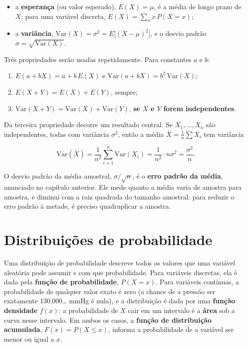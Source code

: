 \documentclass[
]{book}
\providecommand{\tightlist}{%
  \setlength{\itemsep}{0pt}\setlength{\parskip}{0pt}}
\begin{document}
\begin{itemize}
\tightlist
\item
  a \textbf{esperança} (ou valor esperado), \(E(X) = \mu\), é a média de longo prazo de \(X\); para uma variável discreta, \(E(X) = \sum_x x\,P(X = x)\);
\item
  a \textbf{variância}, \(\text{Var}(X) = \sigma^2 = E\big[(X - \mu)^2\big]\), e o desvio padrão \(\sigma = \sqrt{\text{Var}(X)}\).
\end{itemize}

Três propriedades serão usadas repetidamente. Para constantes \(a\) e \(b\):

\begin{enumerate}
\def\labelenumi{\arabic{enumi}.}
\tightlist
\item
  \(E(a + bX) = a + b\,E(X)\) e \(\text{Var}(a + bX) = b^2\,\text{Var}(X)\);
\item
  \(E(X + Y) = E(X) + E(Y)\), sempre;
\item
  \(\text{Var}(X + Y) = \text{Var}(X) + \text{Var}(Y)\), \textbf{se \(X\) e \(Y\) forem independentes}.
\end{enumerate}

Da terceira propriedade decorre um resultado central. Se \(X_1, \ldots, X_n\) são independentes, todas com variância \(\sigma^2\), então a média \(\bar{X} = \frac{1}{n}\sum X_i\) tem variância

\[
\text{Var}(\bar{X}) = \frac{1}{n^2}\sum_{i=1}^{n}\text{Var}(X_i) = \frac{1}{n^2}\cdot n\sigma^2 = \frac{\sigma^2}{n}.
\]

O desvio padrão da média amostral, \(\sigma/\sqrt{n}\), é o \textbf{erro padrão da média}, anunciado no capítulo anterior. Ele mede quanto a média varia de amostra para amostra, e diminui com a raiz quadrada do tamanho amostral: para reduzir o erro padrão à metade, é preciso quadruplicar a amostra.

\section{Distribuições de probabilidade}\label{distribuiuxe7uxf5es-de-probabilidade}

Uma distribuição de probabilidade descreve todos os valores que uma variável aleatória pode assumir e com que probabilidade. Para variáveis discretas, ela é dada pela \textbf{função de probabilidade}, \(P(X = x)\). Para variáveis contínuas, a probabilidade de qualquer valor exato é zero (a chance de a pressão ser exatamente 130,000\ldots{} mmHg é nula), e a distribuição é dada por uma \textbf{função densidade} \(f(x)\): a probabilidade de \(X\) cair em um intervalo é a \textbf{área} sob a curva nesse intervalo. Em ambos os casos, a \textbf{função de distribuição acumulada}, \(F(x) = P(X \le x)\), informa a probabilidade de a variável ser menor ou igual a \(x\).
\end{document}
